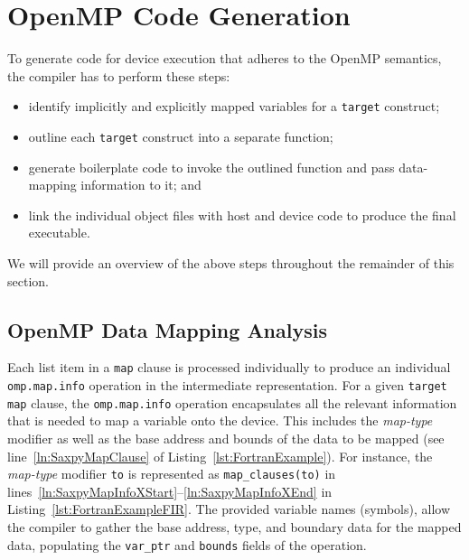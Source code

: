 \documentclass[acmtog,natbib=false]{acmart}
\newcommand{\code}[1]{\texttt{#1}\xspace}
\begin{document}
\section{OpenMP Code Generation}
\label{sec:OpenMPCodeGen}

To generate code for device execution that adheres to the OpenMP semantics, the compiler has to perform these steps:

\begin{itemize}
\item identify implicitly and explicitly mapped variables for a \code{target} construct;
\item outline each \code{target} construct into a separate function;
\item generate boilerplate code to invoke the outlined function and pass data-mapping information to it; and
\item link the individual object files with host and device code to produce the final executable.
\end{itemize}

We will provide an overview of the above steps throughout the remainder of this section.

\subsection{OpenMP Data Mapping Analysis}
\label{sec:OpenMPDataMappingAnalysis}

Each list item in a \code{map} clause is processed individually to produce an individual \code{omp.map.info} operation in the intermediate representation. 
For a given \code{target} \code{map} clause, the \code{omp.map.info} operation encapsulates all the relevant information that is needed to map a variable onto the device.
This includes the \textit{map-type} modifier as well as the base address and bounds of the data to be mapped (see line~\ref{ln:SaxpyMapClause} of Listing~\ref{lst:FortranExample}).
For instance, the \textit{map-type} modifier \code{to} is represented as \code{map\_clauses(to)} in lines~\ref{ln:SaxpyMapInfoXStart}--\ref{ln:SaxpyMapInfoXEnd} in Listing~\ref{lst:FortranExampleFIR}.
The provided variable names (symbols), allow the compiler to gather the base address, type, and boundary data for the mapped data, populating the \code{var\_ptr} and \code{bounds} fields of the operation. 
\end{document}

